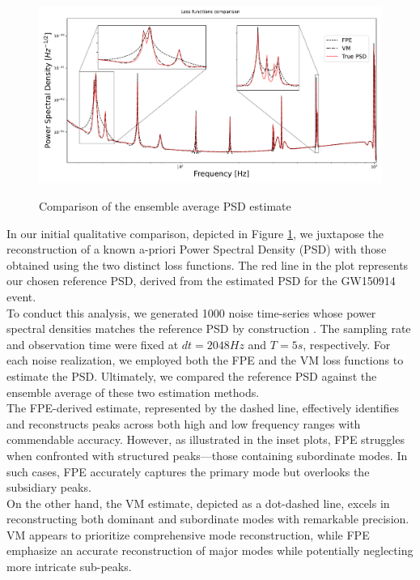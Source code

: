 \documentclass{aa}
\begin{document}
\begin{figure}
	\centering
	\includegraphics[width = \linewidth]{Images/Plots/comparison_loss}
	\label{fig:psd_comparison}
	\caption{Comparison of the ensemble average PSD estimate}
\end{figure}
In our initial qualitative comparison, depicted in Figure \ref{fig:psd_comparison}, we juxtapose the reconstruction of a known a-priori Power Spectral Density (PSD) with those obtained using the two distinct loss functions. The red line in the plot represents our chosen reference PSD, derived from the estimated PSD for the GW150914 event.\\ 
To conduct this analysis, we generated 1000 noise time-series whose power spectral densities matches the reference PSD by construction . The sampling rate and observation time were fixed at $dt = 2048 Hz$ and $T = 5s$, respectively. For each noise realization, we employed both the FPE and the VM loss functions to estimate the PSD. Ultimately, we compared the reference PSD against the ensemble average of these two estimation methods.\\
The FPE-derived estimate, represented by the dashed line, effectively identifies and reconstructs peaks across both high and low frequency ranges with commendable accuracy. However, as illustrated in the inset plots, FPE struggles when confronted with structured peaks—those containing subordinate modes. In such cases, FPE accurately captures the primary mode but overlooks the subsidiary peaks. \\ 
On the other hand, the VM estimate, depicted as a dot-dashed line, excels in reconstructing both dominant and subordinate modes with remarkable precision. VM appears to prioritize comprehensive mode reconstruction, while FPE emphasize an accurate reconstruction of major modes while potentially neglecting more intricate sub-peaks.
\end{document}

